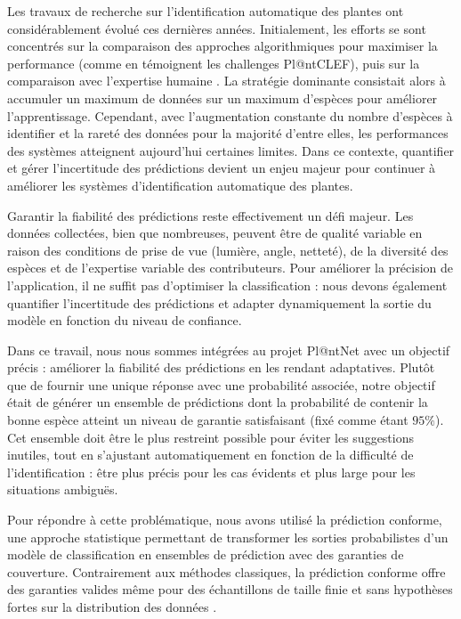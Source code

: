 \documentclass[a4paper,12pt]{article}
\begin{document}
\vspace{0.2cm}

Les travaux de recherche sur l'identification automatique des plantes ont considérablement évolué ces dernières années. Initialement, les efforts se sont concentrés sur la comparaison des approches algorithmiques pour maximiser la performance (comme en témoignent les challenges Pl@ntCLEF), puis sur la comparaison avec l'expertise humaine \cite{Bonnet}. La stratégie dominante consistait alors à accumuler un maximum de données sur un maximum d'espèces pour améliorer l'apprentissage. Cependant, avec l'augmentation constante du nombre d'espèces à identifier et la rareté des données pour la majorité d'entre elles, les performances des systèmes atteignent aujourd'hui certaines limites. Dans ce contexte, quantifier et gérer l'incertitude des prédictions devient un enjeu majeur pour continuer à améliorer les systèmes d'identification automatique des plantes.

\vspace{0.2cm}

Garantir la fiabilité des prédictions reste effectivement un défi majeur. Les données collectées, bien que nombreuses, peuvent être de qualité variable en raison des conditions de prise de vue (lumière, angle, netteté), de la diversité des espèces et de l'expertise variable des contributeurs. Pour améliorer la précision de l'application, il ne suffit pas d’optimiser la classification : nous devons également quantifier l’incertitude des prédictions et adapter dynamiquement la sortie du modèle en fonction du niveau de confiance.

\vspace{0.2cm}

Dans ce travail, nous nous sommes intégrées au projet Pl@ntNet avec un objectif précis : améliorer la fiabilité des prédictions en les rendant adaptatives. Plutôt que de fournir une unique réponse avec une probabilité associée, notre objectif était de générer un ensemble de prédictions dont la probabilité de contenir la bonne espèce atteint un niveau de garantie satisfaisant (fixé comme étant $95\%$). Cet ensemble doit être le plus restreint possible pour éviter les suggestions inutiles, tout en s'ajustant automatiquement en fonction de la difficulté de l’identification : être plus précis pour les cas évidents et plus large pour les situations ambiguës.

\vspace{0.2cm}

Pour répondre à cette problématique, nous avons utilisé la prédiction conforme, une approche statistique permettant de transformer les sorties probabilistes d'un modèle de classification en ensembles de prédiction avec des garanties de couverture. Contrairement aux méthodes classiques, la prédiction conforme offre des garanties valides même pour des échantillons de taille finie et sans hypothèses fortes sur la distribution des données \cite{Angelopoulos}.
\end{document}
